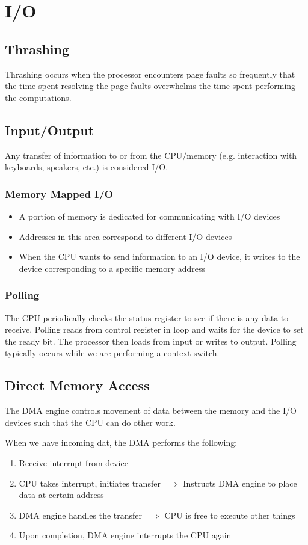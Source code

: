 \chapter{I/O}

\section{Thrashing}
Thrashing occurs when the processor encounters page faults so frequently that the time spent resolving the page faults overwhelms the time spent performing the computations. 

\section{Input/Output}
Any transfer of information to or from the CPU/memory (e.g. interaction with keyboards, speakers, etc.) is considered I/O. 

\subsection{Memory Mapped I/O}
\begin{itemize}
    \item A portion of memory is dedicated for communicating with I/O devices
    \item Addresses in this area correspond to different I/O devices
    \item When the CPU wants to send information to an I/O device, it writes to the device corresponding to a specific memory address
\end{itemize}

\subsection{Polling}
The CPU periodically checks the status register to see if there is any data to receive. Polling reads from control register in loop and waits for the device to set the ready bit. The processor then loads from input or writes to output. Polling typically occurs while we are performing a context switch.

\section{Direct Memory Access}
The DMA engine controls movement of data between the memory and the I/O devices such that the CPU can do other work.

\medskip

When we have incoming dat, the DMA performs the following:
\begin{enumerate}
    \item Receive interrupt from device
    \item CPU takes interrupt, initiates transfer $\implies$ Instructs DMA engine to place data at certain address
    \item DMA engine handles the transfer $\implies$ CPU is free to execute other things
    \item Upon completion, DMA engine interrupts the CPU again
\end{enumerate}
